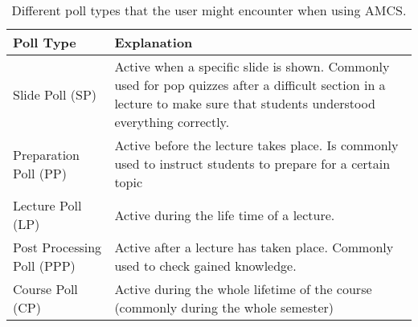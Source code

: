 \begin{table}[t]
	{\renewcommand{\arraystretch}{2}
		\begin{tabular}{ | p{3cm} | p{12cm} |}
			\hline
			Poll Type & Explanation \\ \hline \hline
			Slide Poll (SP) & Active when a specific slide is shown. Commonly used for pop quizzes after a difficult section in a lecture to make sure that students understood everything correctly. \\ \hline
			Preparation Poll (PP) & Active before the lecture takes place. Is commonly used to instruct students to prepare for a certain topic \\ \hline
			Lecture Poll (LP) & Active during the life time of a lecture. \\ \hline
			Post Processing Poll (PPP) & Active after a lecture has taken place. Commonly used to check gained knowledge. \\ \hline
			Course Poll (CP) & Active during the whole lifetime of the course (commonly during the whole semester) \\
			\hline
		\end{tabular}
	}
	\caption{Different poll types that the user might encounter when using AMCS.}
	\label{tab:pollTypes}
\end{table}